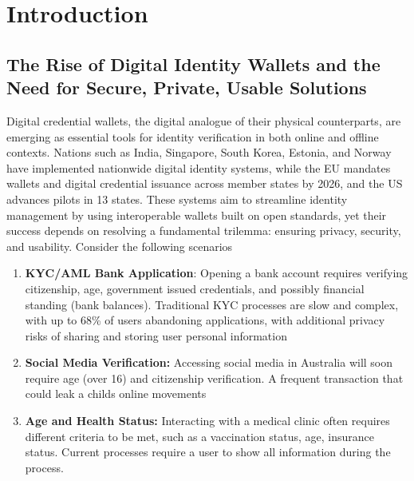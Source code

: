 \chapter{Introduction}

\section{The Rise of Digital Identity Wallets and the Need for Secure, Private, Usable Solutions}
Digital credential wallets, the digital analogue of their physical counterparts, are emerging as essential tools for identity verification in both online and offline contexts. Nations such as India, Singapore, South Korea, Estonia, and Norway have implemented nationwide digital identity systems, while the EU mandates wallets and digital credential issuance across member states by 2026, and the US advances pilots in 13 states.  These systems aim to streamline identity management by using interoperable wallets built on open standards, yet their success depends on resolving a fundamental trilemma: ensuring privacy, security, and usability. Consider the following scenarios

\begin{enumerate}
    \item \textbf{KYC/AML Bank Application}: Opening a bank account requires verifying citizenship, age, government issued credentials, and possibly financial standing (bank balances). Traditional KYC processes are slow and complex, with up to 68\% of users abandoning applications, with additional privacy risks of sharing and storing user personal information

    \item \textbf{Social Media Verification:} Accessing social media in Australia will soon require age (over 16) and citizenship verification. A frequent transaction that could leak a childs online movements 

    \item \textbf{Age and Health Status: } Interacting with a medical clinic often requires different criteria to be met, such as a vaccination status, age, insurance status. Current processes require a user to show all information during the process. 
\end{enumerate}

